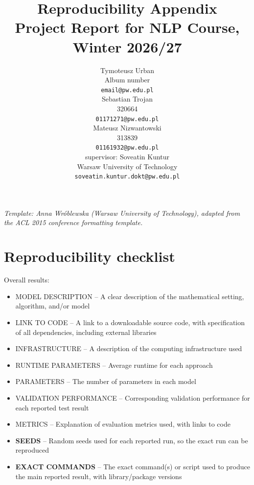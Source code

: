 \documentclass[11pt]{article}
\title{Reproducibility Appendix\\Project Report for NLP Course, Winter 2026/27}
\author{Tymoteusz Urban \\
  Album number \\
  {\tt email@pw.edu.pl} \\\And
  Sebastian Trojan \\
  320664 \\
  {\tt 01171271@pw.edu.pl} \\ \And
  Mateusz Nizwantowski \\
  313839 \\
  {\tt 01161932@pw.edu.pl} \\
  \AND
  supervisor: Soveatin Kuntur\\
  Warsaw University of Technology \\
  {\tt soveatin.kuntur.dokt@pw.edu.pl}
  }
\date{}
\begin{document}
\maketitle

{\small\em Template: Anna Wr\'oblewska (Warsaw University of Technology), adapted from the ACL 2015 conference formatting template.}
\vspace{4pt}


\section*{Reproducibility checklist}


Overall results:
\begin{itemize}
    \item MODEL DESCRIPTION -- A clear description of the mathematical setting, algorithm, and/or model
    \item LINK TO CODE -- A link to a downloadable source code, with specification of all dependencies, including external libraries
    \item INFRASTRUCTURE -- A description of the computing infrastructure used
    \item RUNTIME PARAMETERS -- Average runtime for each approach
    \item PARAMETERS -- The number of parameters in each model
    \item VALIDATION PERFORMANCE -- Corresponding validation performance for each reported test result
    \item METRICS -- Explanation of evaluation metrics used, with links to code
    \item \textbf{SEEDS} -- Random seeds used for each reported run, so the exact run can be reproduced
    \item \textbf{EXACT COMMANDS} -- The exact command(s) or script used to produce the main reported result, with library/package versions
\end{itemize}
\end{document}
